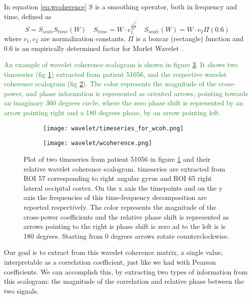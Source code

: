 \documentclass[11pt]{report}
\begin{document}
In equation \ref{eq:wcoherence} S is a smoothing operator, both in frequency and time, defined as \cite{torrence-1999} \cite{grinsted-2004}
\[
S = S_{scale}S_{time}(W) \quad S_{time} = W\cdot c_1 ^{\frac{-t^2}{2a^2}} \quad S_{scale}(W) = W\cdot c_2 \Pi(0.6)
\]
where $c_1, c_2$ are normalization constants, $\Pi$ is a boxcar (rectangle) function and 0.6 is an empirically determined factor for Morlet Wavelet \cite{torrence-1998}.

\textcolor{ForestGreen}{
An example of wavelet coherence scalogram is shown in figure \ref{fig:wcoherence}.
It shows two timeseries (fig \ref{fig:wcoherence_timeseries}) extracted from patient 51056, and the respective wavelet coherence scalogram (fig \ref{fig:wcoherence_scalogram}).
The color represents the magnitude of the cross-power, and phase information is represented as oriented arrows, pointing towards an imaginary 360 degrees circle, where the zero phase shift is represented by an arrow pointing right and a 180 degrees phase, by an arrow pointing left.
}


\begin{figure}
\begin{subfigure}{0.5\textwidth}
\texttt{[image: wavelet/timeseries\_for\_wcoh.png]}
\caption{}
\label{fig:wcoherence_timeseries}
\end{subfigure}
\begin{subfigure}{0.5\textwidth}
\texttt{[image: wavelet/wcoherence.png]}
\caption{}
\label{fig:wcoherence_scalogram}
\end{subfigure}
\caption{Plot of two timeseries from patient 51056 in figure \ref{fig:wcoherence_timeseries} and their relative wavelet coherence scalogram.
timeseries are extracted from ROI 57 corresponding to right angular gyrus and ROI 65 right lateral occipital cortex.
On the x axis the timepoints and on the y axis the frequencies of this time-frequency decomposition are reported respectively.
The color represents the magnitude of the cross-power coefficients and the relative phase shift is represented as arrows pointing to the right is phase shift is zero ad to the left is is 180 degrees. Starting from 0 degrees arrows rotate counterclockwise.
}
\label{fig:wcoherence}
\end{figure}

Our goal is to extract from this wavelet coherence matrix, a single value, interpretable as a correlation coefficient, just like we had with Pearson coefficients.
We can accomplish this, by extracting two types of information from this scalogram: the magnitude of the correlation and relative phase between the two signals.
\end{document}
